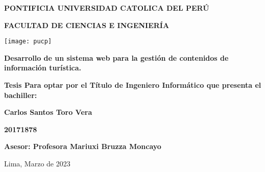 \begin{titlepage}
    \begin{center}
        \vspace*{1cm}
        \Large
        \textbf{PONTIFICIA UNIVERSIDAD CATOLICA DEL PERÚ}

        \vspace{0.5cm}
        \textbf{FACULTAD DE CIENCIAS E INGENIERÍA}

        \vspace{0.5cm}
        \texttt{[image: pucp]}

        \vspace{1.5cm}
        \textbf{Desarrollo de un sistema web para la gestión de contenidos de información turística.}

        \normalsize
        \vspace{3.5cm}
        \textbf{Tesis Para optar por el Título de Ingeniero Informático que presenta el bachiller:}

        \Large
        \vspace{1.5cm}
        \textbf{Carlos Santos Toro Vera}

        \vspace{0.3cm}
        \textbf{20171878}

        \vspace{3cm}
        \textbf{Asesor: Profesora Mariuxi Bruzza Moncayo}

        \normalsize
        \vspace{3cm}
        {Lima, Marzo de 2023}
    \end{center}
\end{titlepage}

